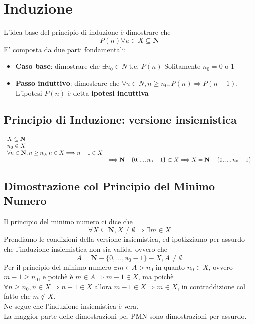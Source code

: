 \documentclass{report}
\begin{document}
\section{Induzione}
    L'idea base del principio di induzione è dimostrare che 
    $$P\left(n\right) \forall n \in X \subseteq \mathbf{N}$$
    E' composta da due parti fondamentali: 
    \begin{itemize}
        \item \textbf{Caso base}: dimostrare che $\exists n_0 \in N \textrm{ t.c. } P\left(n\right)$ 
            Solitamente $n_0 = 0 \textrm{ o } 1$
        \item \textbf{Passo induttivo}: dimostrare che 
            $\forall n \in N, n \geq n_0, P\left(n\right) \Longrightarrow P\left(n+1\right)$. 
            L'ipotesi $P\left(n\right)$ è detta \textbf{ipotesi induttiva}
    \end{itemize}
    \subsection{Principio di Induzione: versione insiemistica}
        $$\begin{array}{l c}
            X \subseteq \mathbf{N} \\
            n_0 \in X & \\
            \forall n \in \mathbf{N}, n \geq n_0, n \in X \Longrightarrow n + 1 \in X & \\
            & \Longrightarrow \mathbf{N} - \{0, ..., n_0 - 1\} \subset X \Longrightarrow X = \mathbf{N} - \{0, ..., n_0 - 1\}
        \end{array}$$
    \subsection{Dimostrazione col Principio del Minimo Numero}
        Il principio del minimo numero ci dice che 
        $$\forall X \subseteq \mathbf{N}, X \neq \emptyset \Longrightarrow \exists m \in X$$
        Prendiamo le condizioni della versione insiemistica, ed ipotizziamo per assurdo che 
        l'induzione insiemistica non sia valida, ovvero che
        $$A = \mathbf{N} - \{0, ..., n_0 - 1\} - X, A \neq \emptyset$$
        Per il principio del minimo numero $\exists m \in A > n_0$ in quanto $n_0 \in X$, ovvero 
        $m - 1 \geq n_0$, e poichè è $m \in A \Longrightarrow m - 1 \in X$, ma poichè
        $\forall n \geq n_0, n \in X \Longrightarrow n + 1 \in X$ allora 
        $m - 1 \in X \Longrightarrow m \in X$, in contraddizione col fatto che $m \notin X$. \\
        Ne segue che l'induzione insiemistica è vera.
        \\
        La maggior parte delle dimostrazioni per PMN sono dimostrazioni per assurdo.
\end{document}
